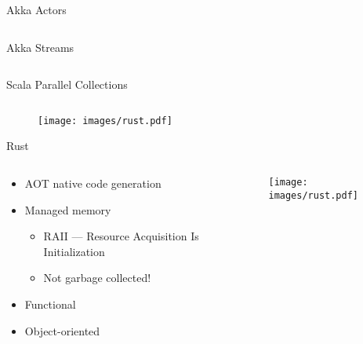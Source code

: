 \documentclass[aspectratio=169,14pt]{beamer}
\begin{document}
\begin{frame}[fragile]{Akka Actors}
  \inputminted{scala}{snippets/actor.scala}
\end{frame}


\begin{frame}[fragile]{Akka Streams}
  \inputminted{scala}{snippets/streams.scala}
\end{frame}

\begin{frame}[fragile]{Scala Parallel Collections}
  \inputminted{scala}{snippets/pcoll.scala}
\end{frame}


\begin{frame}
  \begin{figure}
    \texttt{[image: images/rust.pdf]}
  \end{figure}
\end{frame}


\begin{frame}{Rust}
  \begin{columns}[c]
    \begin{column}{0.6\textwidth}
      \begin{itemize}
      \item AOT native code generation
      \item Managed memory
        \begin{itemize}
          \item RAII --- Resource Acquisition Is Initialization
          \item Not garbage collected!
        \end{itemize}
      \item Functional
      \item Object-oriented
      \end{itemize}
    \end{column}

    \begin{column}{0.4\textwidth}
      \begin{figure}
        \texttt{[image: images/rust.pdf]}
      \end{figure}
    \end{column}
  \end{columns}
\end{frame}
\end{document}
